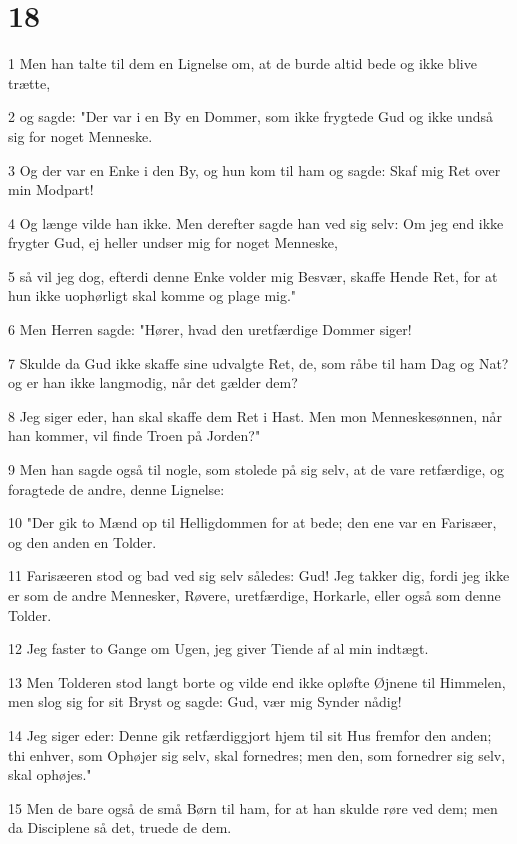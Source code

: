 \chapter{18}

\par 1 Men han talte til dem en Lignelse om, at de burde altid bede og ikke blive trætte,
\par 2 og sagde: "Der var i en By en Dommer, som ikke frygtede Gud og ikke undså sig for noget Menneske.
\par 3 Og der var en Enke i den By, og hun kom til ham og sagde: Skaf mig Ret over min Modpart!
\par 4 Og længe vilde han ikke. Men derefter sagde han ved sig selv: Om jeg end ikke frygter Gud, ej heller undser mig for noget Menneske,
\par 5 så vil jeg dog, efterdi denne Enke volder mig Besvær, skaffe Hende Ret, for at hun ikke uophørligt skal komme og plage mig."
\par 6 Men Herren sagde: "Hører, hvad den uretfærdige Dommer siger!
\par 7 Skulde da Gud ikke skaffe sine udvalgte Ret, de, som råbe til ham Dag og Nat? og er han ikke langmodig, når det gælder dem?
\par 8 Jeg siger eder, han skal skaffe dem Ret i Hast. Men mon Menneskesønnen, når han kommer, vil finde Troen på Jorden?"
\par 9 Men han sagde også til nogle, som stolede på sig selv, at de vare retfærdige, og foragtede de andre, denne Lignelse:
\par 10 "Der gik to Mænd op til Helligdommen for at bede; den ene var en Farisæer, og den anden en Tolder.
\par 11 Farisæeren stod og bad ved sig selv således: Gud! Jeg takker dig, fordi jeg ikke er som de andre Mennesker, Røvere, uretfærdige, Horkarle, eller også som denne Tolder.
\par 12 Jeg faster to Gange om Ugen, jeg giver Tiende af al min indtægt.
\par 13 Men Tolderen stod langt borte og vilde end ikke opløfte Øjnene til Himmelen, men slog sig for sit Bryst og sagde: Gud, vær mig Synder nådig!
\par 14 Jeg siger eder: Denne gik retfærdiggjort hjem til sit Hus fremfor den anden; thi enhver, som Ophøjer sig selv, skal fornedres; men den, som fornedrer sig selv, skal ophøjes."
\par 15 Men de bare også de små Børn til ham, for at han skulde røre ved dem; men da Disciplene så det, truede de dem.
